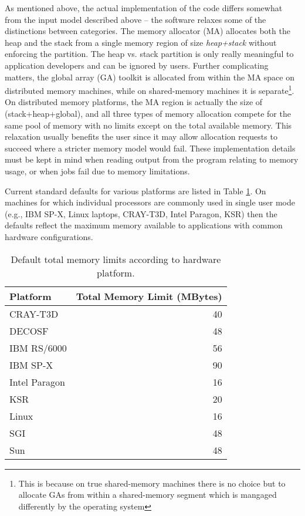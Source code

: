 As mentioned above, the actual implementation of the code differs
somewhat from the input model described above -- the software relaxes
some of the distinctions between categories.  The memory allocator
(MA) allocates both the heap and the stack from a single memory region
of size {\em heap+stack} without enforcing the partition.  The heap
vs. stack partition is only really meaningful to application
developers and can be ignored by users.  Further complicating matters,
the global array (GA) toolkit is allocated from within the MA space on
distributed memory machines, while on shared-memory machines it is
separate\footnote{This is because on true shared-memory machines there
  is no choice but to allocate GAs from within a shared-memory segment
  which is mangaged differently by the operating system}.  On
distributed memory platforms, the MA region is actually the size of
(stack+heap+global), and all three types of memory allocation compete
for the same pool of memory with no limits except on the total
available memory.  This relaxation usually benefits the user since it
may allow allocation requests to succeed where a stricter memory model
would fail.  These implementation details must be kept in mind when
reading output from the program relating to memory usage, or when jobs
fail due to memory limitations.

Current standard defaults for various platforms are listed in Table
\ref{tbl:default-memory-limits}.  On machines for which individual
processors are commonly used in single user mode (e.g., IBM SP-X,
Linux laptops, CRAY-T3D, Intel Paragon, KSR) then the defaults reflect
the maximum memory available to applications with common hardware
configurations.
\begin{table}
\caption{Default total memory limits according to hardware platform.}
\label{tbl:default-memory-limits}
\begin{tabular}{lr}
\hline\hline
Platform        & Total Memory Limit (MBytes) \\
\hline
CRAY-T3D        & 40 \\
DECOSF          & 48 \\
IBM RS/6000     & 56 \\
IBM SP-X        & 90 \\
Intel Paragon   & 16 \\
KSR             & 20 \\
Linux           & 16 \\
SGI             & 48 \\
Sun             & 48 \\
\hline\hline
\end{tabular}
\end{table}

